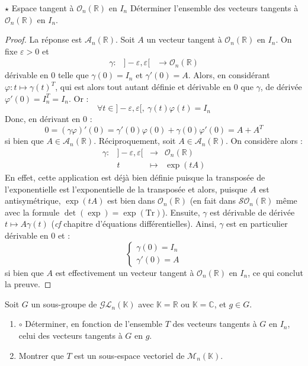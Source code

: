 \documentclass[french,a4paper]{article}
\newcommand{\R}{\mathbb{R}}
\newcommand{\C}{\mathbb{C}}
\newcommand{\K}{\mathbb{K}}
\newcommand{\Tr}{\text{Tr}}
\theoremstyle{plain}
\theoremstyle{definition}
\theoremstyle{remark}
\begin{document}
\begin{ex}[Moulin.63]{$\star$ Espace tangent à $\mathcal{O}_n(\R)$ en $I_n$}
	Déterminer l'ensemble des vecteurs tangents à $\mathcal{O}_n(\R)$ en $I_n$.
\end{ex}
\begin{proof}
	La réponse est $\mathcal{A}_n(\R)$. Soit $A$ un vecteur tangent à $\mathcal{O}_n(\R)$ en $I_n$. On fixe $\varepsilon>0$ et $$\begin{array}{lrcl}
		\gamma :&]-\varepsilon ,\varepsilon[&\longrightarrow \mathcal{O}_n(\R)
	\end{array}$$ dérivable en $0$ telle que $\gamma(0)=I_n$ et $\gamma'(0)=A$. Alors, en considérant $\varphi:t\mapsto\gamma(t)^T$, qui est alors tout autant définie et dérivable en $0$ que $\gamma$, de dérivée $\varphi'(0)=I_n^T=I_n$. Or : $$\forall t\in]-\varepsilon, \varepsilon[,\ \gamma(t)\varphi(t)=I_n$$ Donc, en dérivant en $0$ : $$0=(\gamma\varphi)'(0)=\gamma'(0)\varphi(0)+\gamma(0)\varphi'(0)=A+A^T$$ si bien que $A\in\mathcal{A}_n(\R)$. Réciproquement, soit $A\in\mathcal{A}_n(\R)$. On considère alors : $$\begin{array}{lrcl}
		\gamma:&]-\varepsilon,\varepsilon[&\longrightarrow&\mathcal{O}_n(\R) \\
		&t&\longmapsto&\exp(tA)
	\end{array}$$ En effet, cette application est déjà bien définie puisque la transposée de l'exponentielle est l'exponentielle de la transposée et alors, puisque $A$ est antisymétrique, $\exp(tA)$ est bien dans $\mathcal{O}_n(\R)$ (en fait dans $\mathcal{SO}_n(\R)$ même avec la formule $\det(\exp)=\exp(\Tr)$). Ensuite, $\gamma$ est dérivable de dérivée $t\mapsto A\gamma(t)$ (\textit{cf} chapitre d'équations différentielles). Ainsi, $\gamma$ est en particulier dérivable en $0$ et : $$\begin{cases}
		\gamma(0)=I_n \\
		\gamma'(0)=A
	\end{cases}$$ si bien que $A$ est effectivement un vecteur tangent à $\mathcal{O}_n(\R)$ en $I_n$, ce qui conclut la preuve.
\end{proof}

\begin{ex}[Moulin.64]{}
	Soit $G$ un sous-groupe de $\mathcal{GL}_n(\K)$ avec $\K=\R$ ou $\K=\C$, et $g\in G$.
	\begin{enumerate}
		\item $\circ$ Déterminer, en fonction de l'ensemble $T$ des vecteurs tangents à $G$ en $I_n$, celui des vecteurs tangents à $G$ en $g$.
		\item Montrer que $T$ est un sous-espace vectoriel de $\mathcal{M}_n(\K)$.
	\end{enumerate}
\end{ex}
\end{document}
